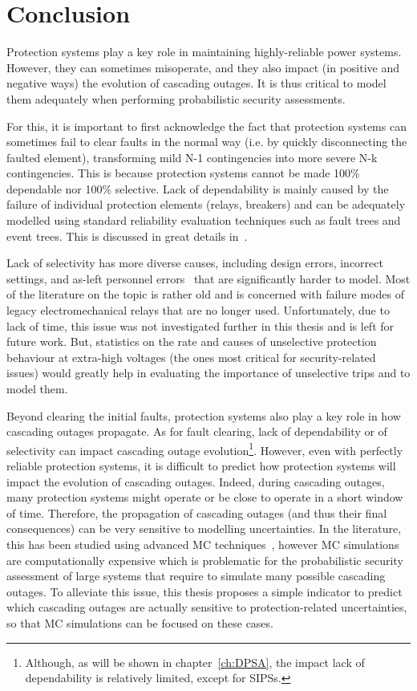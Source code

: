 \section{Conclusion}
\label{sec:protection_conclusion}

Protection systems play a key role in maintaining highly-reliable power systems. However, they can sometimes misoperate, and they also impact (in positive and negative ways) the evolution of cascading outages. It is thus critical to model them adequately when performing probabilistic security assessments.

For this, it is important to first acknowledge the fact that protection systems can sometimes fail to clear faults in the normal way (i.e. by quickly disconnecting the faulted element), transforming mild N-1 contingencies into more severe N-k contingencies. This is because protection systems cannot be made 100\% dependable nor 100\% selective. Lack of dependability is mainly caused by the failure of individual protection elements (relays, breakers) and can be adequately modelled using standard reliability evaluation techniques such as fault trees and event trees. This is discussed in great details in~\cite{GridPSA, Haarla}.

Lack of selectivity has more diverse causes, including design errors, incorrect settings, and as-left personnel errors~\cite{ProtectionMisoperationsBian2012} that are significantly harder to model. Most of the literature on the topic is rather old and is concerned with failure modes of legacy electromechanical relays that are no longer used. Unfortunately, due to lack of time, this issue was not investigated further in this thesis and is left for future work. But, statistics on the rate and causes of unselective protection behaviour at extra-high voltages (the ones most critical for security-related issues) would greatly help in evaluating the importance of unselective trips and to model them.

Beyond clearing the initial faults, protection systems also play a key role in how cascading outages propagate. As for fault clearing, lack of dependability or of selectivity can impact cascading outage evolution\footnote{Although, as will be shown in chapter~\ref{ch:DPSA}, the impact lack of dependability is relatively limited, except for SIPSs.}. However, even with perfectly reliable protection systems, it is difficult to predict how protection systems will impact the evolution of cascading outages. Indeed, during cascading outages, many protection systems might operate or be close to operate in a short window of time. Therefore, the propagation of cascading outages (and thus their final consequences) can be very sensitive to modelling uncertainties. In the literature, this has been studied using advanced MC techniques~\cite{SequencesRelaySobol, TwoLevelPSA}, however MC simulations are computationally expensive which is problematic for the probabilistic security assessment of large systems that require to simulate many possible cascading outages. To alleviate this issue, this thesis proposes a simple indicator to predict which cascading outages are actually sensitive to protection-related uncertainties, so that MC simulations can be focused on these cases.

